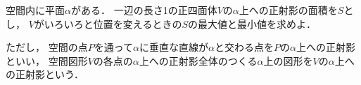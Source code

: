 \documentclass[../../main.tex]{subfiles}
\begin{document}
空間内に平面$\alpha$がある．
一辺の長さ1の正四面体$V$の$\alpha$上への正射影の面積を$S$とし，
$V$がいろいろと位置を変えるときの$S$の最大値と最小値を求めよ．

ただし，
空間の点$P$を通って$\alpha$に垂直な直線が$\alpha$と交わる点を$P$の$\alpha$上への正射影といい，
空間図形$V$の各点の$\alpha$上への正射影全体のつくる$\alpha$上の図形を$V$の$\alpha$上への正射影という．
\end{document}

